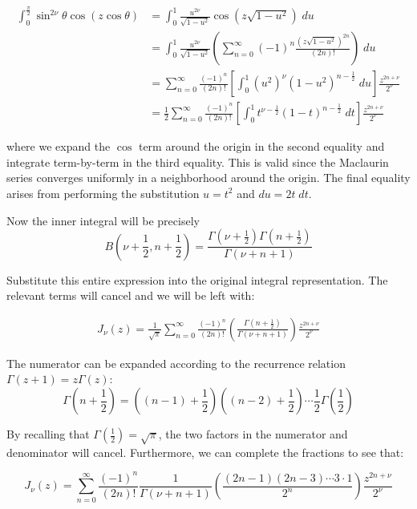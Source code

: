 \documentclass[12pt]{article}%
\newcommand{\infsum}[1][0]{\sum^{\infty}_{n = {#1}}}
\begin{document}
\begin{enumerate}
     \begin{align*}
        \int_0^{\frac{\pi}{2}} \sin^{2\nu}{\theta} \cos(z \cos{\theta}) & = \int_0^1 \frac{u^{2\nu}}{\sqrt{1-u^2}} \cos(z \sqrt{1 - u^2}) \; du \\[1em]
        & = \int_0^1 \frac{u^{2\nu}}{\sqrt{1-u^2}} \left(\infsum (-1)^n \frac{\left(z\sqrt{1-u^2}\right)^{2n}}{(2n)!} \right) \; du \\[1em]
        & = \infsum \frac{(-1)^n}{(2n)!} \left[ \int_0^1 (u^2)^{\nu} \left(1 - u^2\right)^{n - \frac{1}{2}} \; du\right] \frac{z^{2n+\nu}}{2^\nu} \\[1em]
        & = \frac{1}{2}\infsum \frac{(-1)^n}{(2n)!} \left[  \int_0^1 t^{\nu - \frac{1}{2}}(1-t)^{n - \frac{1}{2}} \; dt\right]  \frac{z^{2n+\nu}}{2^\nu}
     \end{align*}

     where we expand the $\cos$ term around the origin in the second equality and integrate term-by-term in the third equality. This is valid since the Maclaurin series converges uniformly in a neighborhood around the origin. The final equality arises from performing the substitution $u = t^2$ and $du = 2t\; dt$.

     Now the inner integral will be precisely $$ B\left(\nu + \frac{1}{2}, n + \frac{1}{2}\right) = \frac{\Gamma(\nu + \frac{1}{2})\Gamma(n + \frac{1}{2})}{\Gamma(\nu + n + 1)}$$

     Substitute this entire expression into the original integral representation. The relevant terms will cancel and we will be left with:

     \begin{align*}
      J_\nu(z) = \frac{1}{\sqrt{\pi}} \infsum \frac{(-1)^n}{(2n)!} \left(\frac{\Gamma(n + \frac{1}{2})}{\Gamma(\nu + n + 1)}\right) \frac{z^{2n+\nu}}{2^\nu}
     \end{align*}

     The numerator can be expanded according to the recurrence relation $\Gamma(z+1) = z\Gamma(z)$:
     \[\Gamma\left(n + \frac{1}{2}\right) = \left((n-1) + \frac{1}{2}\right)\left((n-2) + \frac{1}{2}\right)\cdots\frac{1}{2}\Gamma\left(\frac{1}{2}\right) \]

     By recalling that $\Gamma\left(\frac{1}{2}\right) = \sqrt{\pi}$, the two factors in the numerator and denominator will cancel. Furthermore, we can complete the fractions to see that:

     \[ J_\nu(z) = \infsum \frac{(-1)^n}{(2n)!} \frac{1}{\Gamma(\nu + n + 1)}\left(\frac{(2n-1)(2n-3)\cdots 3 \cdot 1}{2^n}\right) \frac{z^{2n+\nu}}{2^\nu} \]


\end{enumerate}
\end{document}
